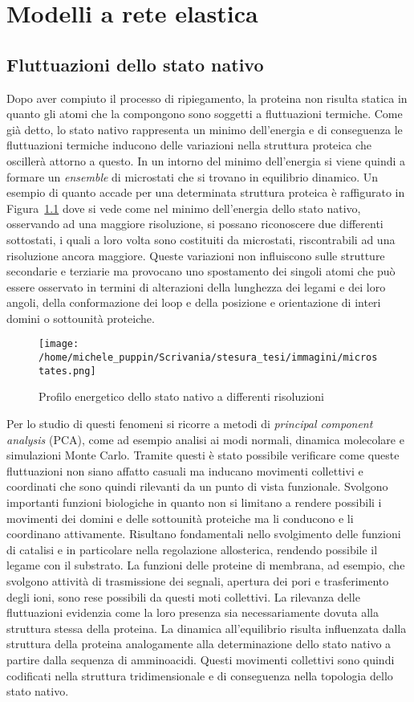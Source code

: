\chapter{Modelli a rete elastica}
\section{Fluttuazioni dello stato nativo}
Dopo aver compiuto il processo di ripiegamento, la proteina non risulta statica in quanto gli atomi che la compongono sono soggetti a fluttuazioni termiche. 
Come già detto, lo stato nativo rappresenta un minimo dell'energia e di conseguenza le fluttuazioni termiche inducono delle variazioni nella struttura proteica che oscillerà attorno a questo. 
In un intorno del minimo dell'energia si viene quindi a formare un \textit{ensemble} di microstati che si trovano in equilibrio dinamico. Un esempio di quanto accade per una determinata struttura proteica è raffigurato in Figura~\ref{fig:microstates} dove si vede come nel minimo dell'energia dello stato nativo, osservando ad una maggiore risoluzione, si possano riconoscere due differenti sottostati, i quali a loro volta sono costituiti da microstati, riscontrabili ad una risoluzione ancora maggiore. 
Queste variazioni non influiscono sulle strutture secondarie e terziarie ma provocano uno spostamento dei singoli atomi che può essere osservato in termini di alterazioni della lunghezza dei legami e dei loro angoli, della conformazione dei loop e della posizione e orientazione di interi domini o sottounità proteiche. \cite{chem_rev}
\begin{figure}[h]
	\centering
	\texttt{[image: /home/michele\_puppin/Scrivania/stesura\_tesi/immagini/microstates.png]}
	\caption{Profilo energetico dello stato nativo a differenti risoluzioni \cite{chem_rev}}
	\label{fig:microstates}
\end{figure}

Per lo studio di questi fenomeni si ricorre a metodi di \textit{principal component analysis} (PCA), come ad esempio analisi ai modi normali, dinamica molecolare e simulazioni Monte Carlo.
Tramite questi è stato possibile verificare come queste fluttuazioni non siano affatto casuali ma inducano movimenti collettivi e coordinati che sono quindi rilevanti da un punto di vista funzionale.
Svolgono importanti funzioni biologiche in quanto non si limitano a rendere possibili i movimenti dei domini e delle sottounità proteiche ma li conducono e li coordinano attivamente. Risultano fondamentali nello svolgimento delle funzioni di catalisi e in particolare nella regolazione allosterica, rendendo possibile il legame con il substrato. La funzioni delle proteine di membrana, ad esempio, che svolgono attività di trasmissione dei segnali, apertura dei pori e trasferimento degli ioni, sono rese possibili da questi moti collettivi.
La rilevanza delle fluttuazioni evidenzia come la loro presenza sia necessariamente dovuta alla struttura stessa della proteina. La dinamica all'equilibrio risulta influenzata dalla struttura della proteina analogamente alla determinazione dello stato nativo a partire dalla sequenza di amminoacidi. Questi movimenti collettivi sono quindi codificati nella struttura tridimensionale e di conseguenza nella topologia dello stato nativo. \cite{chem_rev} 

